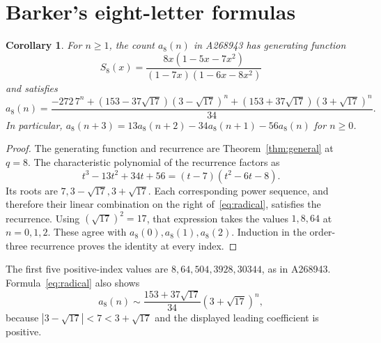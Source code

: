 \documentclass[11pt]{article}
\newtheorem{corollary}[theorem]{Corollary}
\begin{document}
\section{Barker's eight-letter formulas}
\begin{corollary}\label{cor:barker}
For $n\geq1$, the count $a_8(n)$ in A268943 has generating function
\[
 S_8(x)=\frac{8x(1-5x-7x^2)}{(1-7x)(1-6x-8x^2)}
\]
and satisfies
\begin{equation}\label{eq:radical}
 a_8(n)=\frac{-272\,7^n+(153-37\sqrt{17})(3-\sqrt{17})^n
                    +(153+37\sqrt{17})(3+\sqrt{17})^n}{34}.
\end{equation}
In particular, $a_8(n+3)=13a_8(n+2)-34a_8(n+1)-56a_8(n)$ for $n\geq0$.
\end{corollary}
\begin{proof}
The generating function and recurrence are Theorem~\ref{thm:general} at
$q=8$. The characteristic polynomial of the recurrence factors as
\[
 t^3-13t^2+34t+56=(t-7)(t^2-6t-8).
\]
Its roots are $7,3-\sqrt{17},3+\sqrt{17}$. Each corresponding power sequence,
and therefore their linear combination on the right of~\eqref{eq:radical},
satisfies the recurrence. Using $(\sqrt{17})^2=17$, that expression takes
the values $1,8,64$ at $n=0,1,2$. These agree with $a_8(0),a_8(1),a_8(2)$.
Induction in the order-three recurrence proves the identity at every index.
\end{proof}

The first five positive-index values are $8,64,504,3928,30344$, as in
A268943. Formula~\eqref{eq:radical} also shows
\[
 a_8(n)\sim\frac{153+37\sqrt{17}}{34}(3+\sqrt{17})^n,
\]
because $|3-\sqrt{17}|<7<3+\sqrt{17}$ and the displayed leading coefficient
is positive.
\end{document}
